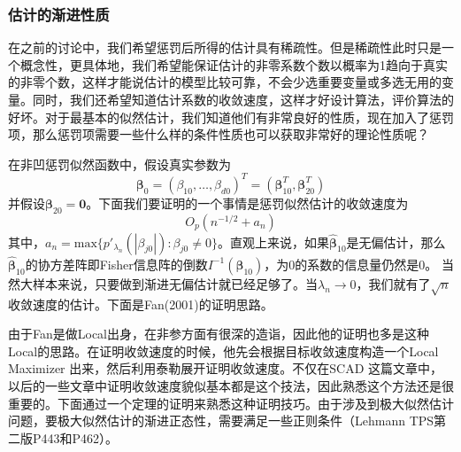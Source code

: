 ﻿\documentclass[hyperref,12pt]{ctexart}
\begin{document}
\subsubsection{估计的渐进性质}
在之前的讨论中，我们希望惩罚后所得的估计具有稀疏性。但是稀疏性此时只是一个概念性，更具体地，我们希望能保证估计的非零系数个数以概率为1趋向于真实的非零个数，这样才能说估计的模型比较可靠，不会少选重要变量或多选无用的变量。同时，我们还希望知道估计系数的收敛速度，这样才好设计算法，评价算法的好坏。对于最基本的似然估计，我们知道他们有非常良好的性质，现在加入了惩罚项，那么惩罚项需要一些什么样的条件性质也可以获取非常好的理论性质呢？

在非凹惩罚似然函数中，假设真实参数为
\[
\boldsymbol{\beta}_0 = (\beta_{10},\ldots,\beta_{d0})^T =(\boldsymbol{\beta}_{10}^T, \boldsymbol{\beta}_{20}^T)
\]
并假设$\boldsymbol{\beta}_{20} = \mathbf{0}$。下面我们要证明的一个事情是惩罚似然估计的收敛速度为
\[
O_p(n^{-1/2} + a_n)
\]
其中，$a_n = \text{max}\{p'_{\lambda_n}(|\beta_{j0}|): \beta_{j0} \neq 0\}$。直观上来说，如果$\hat{\boldsymbol{\beta}}_{10}$是无偏估计，那么$\hat{\boldsymbol{\beta}}_{10}$的协方差阵即Fisher信息阵的倒数$I^{-1}(\boldsymbol{\beta}_{10})$，为0的系数的信息量仍然是0。 当然大样本来说，只要做到渐进无偏估计就已经足够了。当$\lambda_n \rightarrow 0$，我们就有了$\sqrt{n}$收敛速度的估计。下面是Fan(2001)的证明思路。

由于Fan是做Local出身，在非参方面有很深的造诣，因此他的证明也多是这种Local的思路。在证明收敛速度的时候，他先会根据目标收敛速度构造一个Local Maximizer 出来，然后利用泰勒展开证明收敛速度。不仅在SCAD 这篇文章中，以后的一些文章中证明收敛速度貌似基本都是这个技法，因此熟悉这个方法还是很重要的。下面通过一个定理的证明来熟悉这种证明技巧。由于涉及到极大似然估计问题，要极大似然估计的渐进正态性，需要满足一些正则条件（Lehmann TPS第二版P443和P462）。
\end{document}
